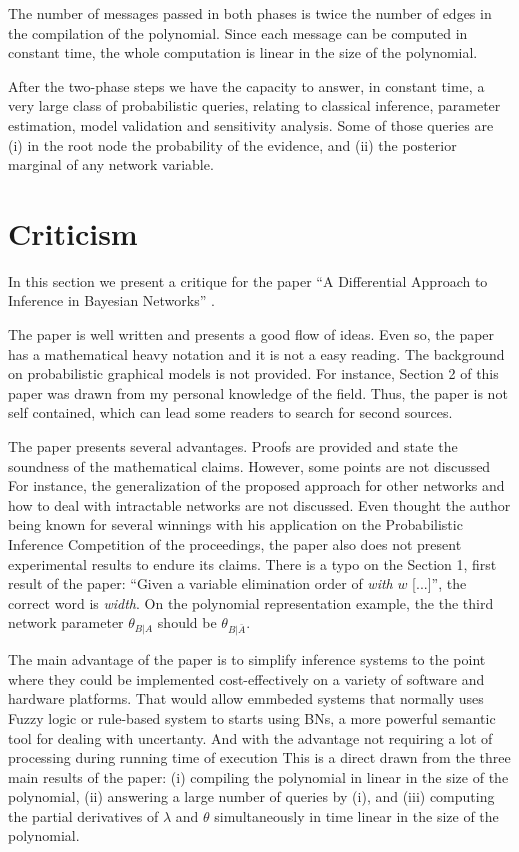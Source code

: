 \documentclass[twoside,11pt]{article}
\begin{document}
The number of messages passed in both phases is twice the number of edges in the compilation of the polynomial.
Since each message can be computed in constant time, the whole computation is linear in the size of the polynomial.

After the two-phase steps we have the capacity to answer, in constant time, a very large class of probabilistic queries, relating to classical inference, parameter estimation, model validation and sensitivity analysis.
Some of those queries are
(i) in the root node the probability of the evidence, and 
(ii) the posterior marginal of any network variable.

\section{Criticism}
\label{sec:crt}

In this section we present a critique for the paper ``A Differential Approach to Inference in Bayesian Networks'' \citep{darwiche00}.

The paper is well written and presents a good flow of ideas.
Even so, the paper has a mathematical heavy notation and it is not a easy reading.
The background on probabilistic graphical models is not provided.
For instance, Section 2 of this paper was drawn from my personal knowledge of the field.
Thus, the paper is not self contained, which can lead some readers to search for second sources.


The paper presents several advantages.
Proofs are provided and state the soundness of the mathematical claims.
However, some points are not discussed
For instance, the generalization of the proposed approach for other networks and how to deal with intractable networks are not discussed. 
Even thought the author being known for several winnings with his application on the Probabilistic Inference Competition of the proceedings, the paper also does not present experimental results to endure its claims.
There is a typo on the Section 1, first result of the paper: ``Given a variable elimination order of \emph{with} $w$ [...]'', the correct word is \emph{width}.
On the polynomial representation example, the the third network parameter $\theta_{B|A}$ should be $\theta_{B|\bar{A}}$.


The main advantage of the paper is to simplify inference systems to the point where they could be implemented cost-effectively on a variety of software and hardware platforms.
That would allow emmbeded systems that normally uses Fuzzy logic or rule-based system to starts using BNs, a more powerful semantic tool for dealing with uncertanty.
And with the advantage not requiring a lot of processing during running time of execution
This is a direct drawn from the three main results of the paper:
(i) compiling the polynomial in linear in the size of the polynomial,
(ii) answering a large number of queries by (i), and
(iii) computing the partial derivatives of $\lambda$ and $\theta$ simultaneously in time linear in the size of the polynomial.
\end{document}
